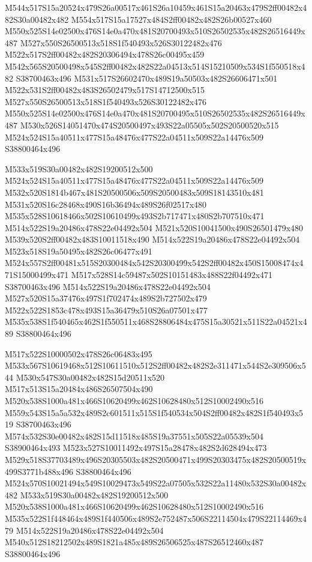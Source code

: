 \documentclass{article}
\begin{document}
\begin{multicols}{2}
M544x517S15a20524x479S26a00517x461S26a10459x461S15a20463x479S2ff00482x482S30a00482x482 M554x517S15a17527x484S2ff00482x482S26b00527x460 M550x525S14e02500x476S14e0a470x481S20700493x510S26502535x482S26516449x487 M527x550S26500513x518S1f540493x526S30122482x476 M522x517S2ff00482x482S20306494x478S26c00495x459 M542x565S20500498x545S2ff00482x482S22a04513x514S15210509x534S1f550518x482 S38700463x496 M531x517S26602470x489S19a50503x482S26606471x501 M522x531S2ff00482x483S26502479x517S14712500x515 M527x550S26500513x518S1f540493x526S30122482x476 M550x525S14e02500x476S14e0a470x481S20700495x510S26502535x482S26516449x487 M530x526S14051470x474S20500497x493S22a05505x502S20500520x515 M524x524S15a40511x477S15a48476x477S22a04511x509S22a14476x509 S38800464x496

M533x519S30a00482x482S19200512x500 M524x524S15a40511x477S15a48476x477S22a04511x509S22a14476x509 M532x520S1814b467x481S20500506x509S20500483x509S18143510x481 M531x520S16c28468x490S16b36494x489S26f02517x480 M535x528S10618466x502S10610499x493S2b717471x480S2b707510x471 M514x522S19a20486x478S22e04492x504 M521x520S10041500x490S26501479x480 M539x520S2ff00482x483S10011518x490 M514x522S19a20486x478S22e04492x504 M523x518S19a50495x482S26c06477x491 M524x557S2ff00481x515S20300484x542S20300499x542S2ff00482x450S15008474x471S15000499x471 M517x528S14c59487x502S10151483x488S22f04492x471 S38700463x496 M514x522S19a20486x478S22e04492x504 M527x520S15a37476x497S1f702474x489S2b727502x479 M522x522S1853c478x493S15a36479x510S26a07501x477 M535x538S1f540465x462S1f550511x468S28806484x475S15a30521x511S22a04521x489 S38800464x496

M517x522S10000502x478S26c06483x495 M533x567S10619468x512S10611510x512S2ff00482x482S2e311471x544S2e309506x544 M530x547S30a00482x482S15d20511x520 M517x513S15a20484x486S26507504x490 M520x538S1000a481x466S10620499x462S10628480x512S10002490x516 M559x543S15a5a532x489S2c601511x515S1f540534x504S2ff00482x482S1f540493x519 S38700463x496 M574x532S30e00482x482S15d11518x485S19a37551x505S22a05539x504 S38900464x493 M523x527S10011492x497S15a28478x482S2d628494x473 M529x518S37703489x496S20305503x482S20500471x499S20303475x482S20500519x499S3771b488x496 S38800464x496 M524x570S10021494x549S10029473x549S22a07505x532S22a11480x532S30a00482x482 M533x519S30a00482x482S19200512x500 M520x538S1000a481x466S10620499x462S10628480x512S10002490x516 M535x522S1f448464x489S1f440506x489S2e752487x506S22114504x479S22114469x479 M514x522S19a20486x478S22e04492x504 M540x512S18212502x489S1821a485x489S26506525x487S26512460x487 S38800464x496


\end{multicols}
\end{document}
